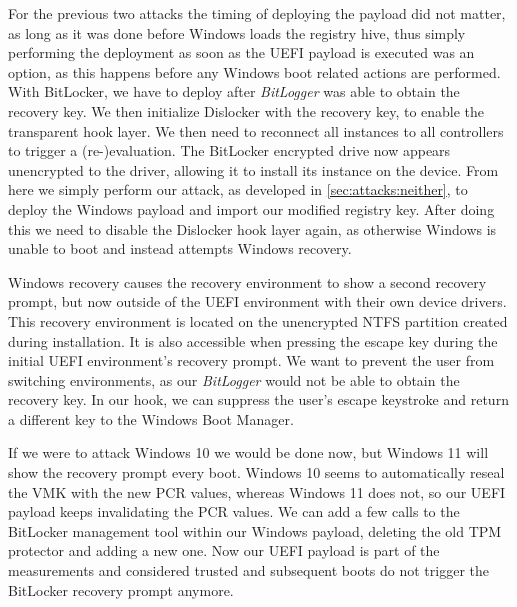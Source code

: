 \vspace{1em}



For the previous two attacks the timing of deploying the payload did not matter, as long as it was done before Windows loads the  registry hive, thus simply performing the deployment as soon as the \ac{UEFI} payload is executed was an option, as this happens before any Windows boot related actions are performed.
With BitLocker, we have to deploy after \emph{BitLogger} was able to obtain the recovery key.
We then initialize Dislocker with the recovery key, to enable the transparent  hook layer.
We then need to reconnect all  instances to all controllers to trigger a (re-)evaluation.
The BitLocker encrypted drive now appears unencrypted to the driver, allowing it to install its  instance on the device.
From here we simply perform our attack, as developed in \autoref{sec:attacks:neither}, to deploy the Windows payload and import our modified registry key.
After doing this we need to disable the Dislocker hook layer again, as otherwise Windows is unable to boot and instead attempts Windows recovery.

Windows recovery causes the recovery environment to show a second recovery prompt, but now outside of the \ac{UEFI} environment with their own device drivers.
This recovery environment is located on the unencrypted \ac{NTFS} partition created during installation.
It is also accessible when pressing the escape key during the initial \ac{UEFI} environment's recovery prompt.
We want to prevent the user from switching environments, as our \emph{BitLogger} would not be able to obtain the recovery key.
In our  hook, we can suppress the user's escape keystroke and return a different key to the Windows Boot Manager.

If we were to attack Windows 10 we would be done now, but Windows 11 will show the recovery prompt every boot.
Windows 10 seems to automatically reseal the \ac{VMK} with the new \ac{PCR} values, whereas Windows 11 does not, so our \ac{UEFI} payload keeps invalidating the \ac{PCR} values.
We can add a few calls to the BitLocker management tool  \cite{microsoft-bitlocker-manage-bde} within our Windows payload, deleting the old \ac{TPM} protector and adding a new one.
Now our \ac{UEFI} payload is part of the measurements and considered trusted and subsequent boots do not trigger the BitLocker recovery prompt anymore.

